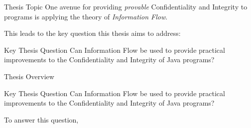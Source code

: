 \begin{frame}{Thesis Topic}
	One avenue for providing \textit{provable} Confidentiality and Integrity to programs is applying the theory of \textit{Information Flow}.
	
	This leads to the key question this thesis aims to address:
	
	\begin{block}{Key Thesis Question}
		Can Information Flow be used to provide practical improvements to the Confidentiality and Integrity of Java programs?
	\end{block}
\end{frame}

\begin{frame}{Thesis Overview}
	\begin{block}{Key Thesis Question}
		Can Information Flow be used to provide practical improvements to the Confidentiality and Integrity of Java programs?
	\end{block}

	To answer this question, 
\end{frame}